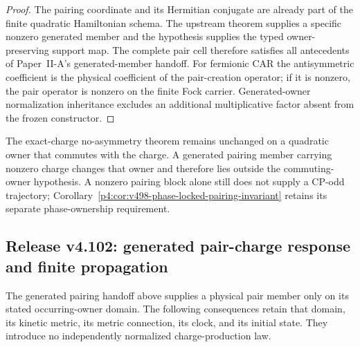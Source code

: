 \documentclass[12pt,a4paper]{article}
\begin{document}
\begin{proof}
The pairing coordinate and its Hermitian conjugate are already part of the
finite quadratic Hamiltonian schema.  The upstream theorem supplies a
specific nonzero generated member and the hypothesis supplies the typed
owner-preserving support map.  The complete pair cell therefore satisfies all
antecedents of Paper~II-A's generated-member handoff.  For fermionic CAR the
antisymmetric coefficient is the physical coefficient of the pair-creation
operator; if it is nonzero, the pair operator is nonzero on the finite Fock
carrier.  Generated-owner normalization inheritance excludes an additional
multiplicative factor absent from the frozen constructor.
\end{proof}

\begin{remark}
\label{p4:rem:v4101-exact-charge-scope}
The exact-charge no-asymmetry theorem remains unchanged on a quadratic owner
that commutes with the charge.  A generated pairing member carrying nonzero
charge changes that owner and therefore lies outside the commuting-owner
hypothesis.  A nonzero pairing block alone still does not supply a CP-odd
trajectory; Corollary~\ref{p4:cor:v498-phase-locked-pairing-invariant} retains
its separate phase-ownership requirement.
\end{remark}




\subsection{Release v4.102: generated pair-charge response and finite propagation}
\label{p4:sec:v4102-pair-charge-response}

The generated pairing handoff above supplies a physical pair member only on
its stated occurring-owner domain.  The following consequences retain that
domain, its kinetic metric, its metric connection, its clock, and its initial
state.  They introduce no independently normalized charge-production law.
\end{document}
